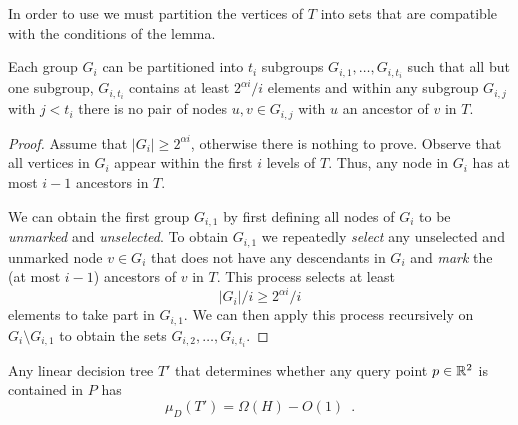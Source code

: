 \documentclass[charterfonts,lotsofwhite]{patmorin}
\begin{document}
In order to use  we must partition the vertices of
$T$ into sets that are compatible with the conditions of the lemma.

\begin{lem}
Each group $G_i$ can be partitioned into $t_i$ subgroups
$G_{i,1},\ldots,G_{i,t_i}$ such that all but one subgroup, $G_{i,t_i}$
contains at least $2^{\alpha i}/i$ elements and within any subgroup
$G_{i,j}$ with $j < t_i$ there is no pair of nodes $u,v\in G_{i,j}$
with $u$ an ancestor of $v$ in $T$.
\end{lem}

\begin{proof}
Assume that $|G_i|\ge 2^{\alpha i}$, otherwise there is nothing to
prove.  Observe that all vertices in $G_i$ appear within the first $i$
levels of $T$.  Thus, any node in $G_i$ has at most $i-1$ ancestors in
$T$.  

We can obtain the first group $G_{i,1}$ by first defining all nodes of
$G_i$ to be \emph{unmarked} and \emph{unselected}.  To obtain
$G_{i,1}$ we repeatedly \emph{select} any unselected and unmarked
node $v\in G_i$ that does not have any descendants in $G_i$ and
\emph{mark} the (at most $i-1$) ancestors of $v$ in $T$.  This
process selects at least
\[
   |G_i|/i \ge 2^{\alpha i}/i
\] 
elements to take part in $G_{i,1}$.  We can then apply this process
recursively on $G_i\setminus G_{i,1}$ to obtain the sets
$G_{i,2},\ldots,G_{i,t_i}$.
\end{proof}


\begin{thm}
Any linear decision tree $T'$ that determines whether any query point 
$p\in\mathbb{R}^2$ is contained in $P$ has
\[
   \mu_D(T') = \Omega(H) - O(1) \enspace .
\]
\end{thm}
\end{document}
